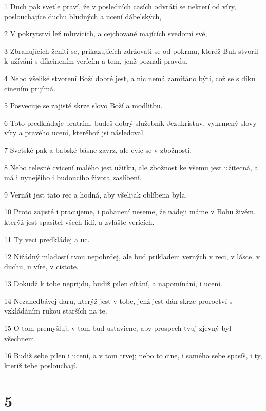 \par 1 Duch pak svetle praví, že v posledních casích odvrátí se nekterí od víry, poslouchajíce duchu bludných a ucení dábelských,
\par 2 V pokrytství lež mluvících, a cejchované majících svedomí své,
\par 3 Zbranujících ženiti se, prikazujících zdržovati se od pokrmu, kteréž Buh stvoril k užívání s díkcinením verícím a tem, jenž poznali pravdu.
\par 4 Nebo všeliké stvorení Boží dobré jest, a nic nemá zamítáno býti, což se s díku cinením prijímá.
\par 5 Posvecuje se zajisté skrze slovo Boží a modlitbu.
\par 6 Toto predkládaje bratrím, budeš dobrý služebník Jezukristuv, vykrmený slovy víry a pravého ucení, kteréhož jsi následoval.
\par 7 Svetské pak a babské básne zavrz, ale cvic se v zbožnosti.
\par 8 Nebo telesné cvicení malého jest užitku, ale zbožnost ke všemu jest užitecná, a má i nynejšího i budoucího života zaslíbení.
\par 9 Vernát jest tato rec a hodná, aby všelijak oblíbena byla.
\par 10 Proto zajisté i pracujeme, i pohanení neseme, že nadeji máme v Bohu živém, kterýž jest spasitel všech lidí, a zvlášte verících.
\par 11 Ty veci predkládej a uc.
\par 12 Nižádný mladostí tvou nepohrdej, ale bud príkladem verných v reci, v lásce, v duchu, u víre, v cistote.
\par 13 Dokudž k tobe neprijdu, budiž pilen cítání, a napomínání, i ucení.
\par 14 Nezanedbávej daru, kterýž jest v tobe, jenž jest dán skrze proroctví s vzkládáním rukou starších na te.
\par 15 O tom premyšluj, v tom bud ustavicne, aby prospech tvuj zjevný byl všechnem.
\par 16 Budiž sebe pilen i ucení, a v tom trvej; nebo to cine, i samého sebe spasíš, i ty, kteríž tebe poslouchají.

\chapter{5}

